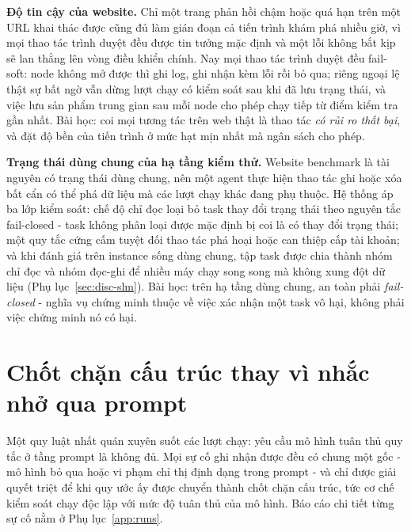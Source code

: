 \textbf{Độ tin cậy của website.} Chỉ một trang phản hồi chậm hoặc quá hạn trên
một URL khai thác được cũng đủ làm gián đoạn cả tiến trình khám phá nhiều giờ,
vì mọi thao tác trình duyệt đều được tin tưởng mặc định và một lỗi không bắt
kịp sẽ lan thẳng lên vòng điều khiển chính. Nay mọi thao tác trình duyệt đều
fail-soft: node không mở được thì ghi log, ghi nhận kèm lỗi rồi bỏ qua; riêng
ngoại lệ thật sự bất ngờ vẫn dừng lượt chạy có kiểm soát sau khi đã lưu trạng
thái, và việc lưu sản phẩm trung gian sau mỗi node cho phép chạy tiếp từ điểm
kiểm tra gần nhất. Bài học: coi mọi tương tác trên web thật là thao tác
\emph{có rủi ro thất bại}, và đặt độ bền của tiến trình ở mức hạt mịn nhất mà
ngân sách cho phép.

\textbf{Trạng thái dùng chung của hạ tầng kiểm thử.} Website benchmark là tài
nguyên có trạng thái dùng chung, nên một agent thực hiện thao tác ghi hoặc xóa
bất cẩn có thể phá dữ liệu mà các lượt chạy khác đang phụ thuộc. Hệ thống áp ba
lớp kiểm soát: chế độ chỉ đọc loại bỏ task thay đổi trạng thái theo nguyên tắc
fail-closed - task không phân loại được mặc định bị coi là có thay đổi trạng
thái; một quy tắc cứng cấm tuyệt đối thao tác phá hoại hoặc can thiệp cấp tài
khoản; và khi đánh giá trên instance sống dùng chung, tập task được chia thành
nhóm chỉ đọc và nhóm đọc-ghi để nhiều máy chạy song song mà không xung đột dữ
liệu (Phụ lục~\ref{sec:disc-slm}). Bài học: trên hạ tầng dùng chung, an toàn phải
\emph{fail-closed} - nghĩa vụ chứng minh thuộc về việc xác nhận một task vô
hại, không phải việc chứng minh nó có hại.

\section{Chốt chặn cấu trúc thay vì nhắc nhở qua prompt}
\label{sec:disc-guardrails}

Một quy luật nhất quán xuyên suốt các lượt chạy: yêu cầu mô hình tuân thủ quy
tắc ở tầng prompt là không đủ. Mọi sự cố ghi nhận được đều có chung một gốc -
mô hình bỏ qua hoặc vi phạm chỉ thị định dạng trong prompt - và chỉ được giải
quyết triệt để khi quy ước ấy được chuyển thành chốt chặn cấu trúc, tức cơ chế
kiểm soát chạy độc lập với mức độ tuân thủ của mô hình. Báo cáo chi tiết từng
sự cố nằm ở Phụ lục~\ref{app:runs}.

